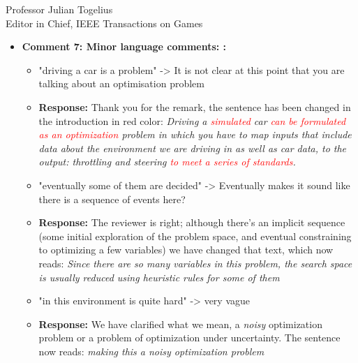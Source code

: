 \documentclass[10pt]{letter} %
\begin{document}
\begin{letter}{Professor Julian Togelius \\ Editor in Chief, IEEE Transactions on Games}
\begin{enumerate}
\begin{itemize}
	\item {\bf   Comment 7: Minor language comments: :} 
				\begin{itemize}
				\item 	"driving a car is a problem" -> It is not clear at this point that you are talking about an optimisation problem
				\item {\bf Response:}  
				Thank you for the remark, the sentence has been changed in the introduction in red color:
				{\em  Driving a \textcolor{red}{simulated} car \textcolor{red}{can be formulated as an optimization} problem in which you have to map inputs that include data about the environment we are driving in as well as car
data, to the output: throttling and steering \textcolor{red}{to meet a series of standards}.}
				\\
				\item 	"eventually some of them are decided" -> Eventually makes it sound like there is a sequence of events here?
				\item {\bf Response:} 
The reviewer is right; although there's an implicit sequence (some initial exploration of the problem space, and eventual constraining to optimizing a few variables) we have changed that text, which now reads: {\em Since there are so many variables in this problem, the search space is usually reduced using heuristic rules for some of them}
				\item 	"in this environment is quite hard" -> very vague
 				\item {\bf Response:} %
                                  We have clarified what we mean, a {\em noisy} optimization problem or a problem of optimization under uncertainty. The sentence now reads: {\em making this a {\em noisy} optimization problem }



\end{itemize}
\end{itemize}
\end{enumerate}
\end{letter}
\end{document}
